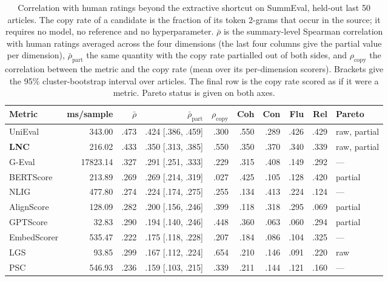 \begin{table}[t]
\centering
\caption{Correlation with human ratings beyond the extractive shortcut on SummEval, held-out last 50 articles. The copy rate of a candidate is the fraction of its token 2-grams that occur in the source; it requires no model, no reference and no hyperparameter. $\bar{\rho}$ is the summary-level Spearman correlation with human ratings averaged across the four dimensions (the last four columns give the partial value per dimension), $\bar{\rho}_{\mathrm{part}}$ the same quantity with the copy rate partialled out of both sides, and $\rho_{\mathrm{copy}}$ the correlation between the metric and the copy rate (mean over its per-dimension scorers). Brackets give the 95\% cluster-bootstrap interval over articles. The final row is the copy rate scored as if it were a metric. Pareto status is given on both axes.}
\label{tab:confound}
\small
\linespread{1}\selectfont
\setlength{\tabcolsep}{4pt}
\begin{tabular}{@{}lrrrrrrrrl@{}}
\toprule
Metric & ms/sample & $\bar{\rho}$ & $\bar{\rho}_{\mathrm{part}}$ & $\rho_{\mathrm{copy}}$ & Coh & Con & Flu & Rel & Pareto \\
\midrule
UniEval & 343.00 & .473 & .424 {\scriptsize [.386, .459]} & .300 & .550 & .289 & .426 & .429 & raw, partial \\
\textbf{LNC} & 216.02 & .433 & .350 {\scriptsize [.313, .385]} & .550 & .350 & .370 & .340 & .339 & raw, partial \\
G-Eval & 17823.14 & .327 & .291 {\scriptsize [.251, .333]} & .229 & .315 & .408 & .149 & .292 & --- \\
BERTScore & 213.89 & .269 & .269 {\scriptsize [.214, .319]} & .027 & .425 & .105 & .128 & .420 & partial \\
NLIG & 477.80 & .274 & .224 {\scriptsize [.174, .275]} & .255 & .134 & .413 & .224 & .124 & --- \\
AlignScore & 128.09 & .282 & .200 {\scriptsize [.156, .246]} & .399 & .118 & .318 & .295 & .069 & partial \\
GPTScore & 32.83 & .290 & .194 {\scriptsize [.140, .246]} & .448 & .360 & .063 & .060 & .294 & partial \\
EmbedScorer & 535.47 & .222 & .175 {\scriptsize [.118, .228]} & .207 & .184 & .086 & .104 & .325 & --- \\
LGS & 93.85 & .299 & .167 {\scriptsize [.112, .224]} & .654 & .210 & .146 & .091 & .220 & raw \\
PSC & 546.93 & .236 & .159 {\scriptsize [.103, .215]} & .339 & .211 & .144 & .121 & .160 & --- \\

\end{tabular}
\end{table}
